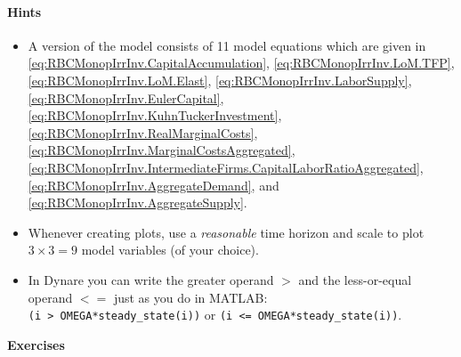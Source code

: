 \documentclass{article}
\begin{document}
\paragraph{Hints}
\begin{itemize}
\item A version of the model consists of 11 model equations which are given in
\eqref{eq:RBCMonopIrrInv.CapitalAccumulation},
\eqref{eq:RBCMonopIrrInv.LoM.TFP},
\eqref{eq:RBCMonopIrrInv.LoM.Elast},
\eqref{eq:RBCMonopIrrInv.LaborSupply},
\eqref{eq:RBCMonopIrrInv.EulerCapital},
\eqref{eq:RBCMonopIrrInv.KuhnTuckerInvestment},
\eqref{eq:RBCMonopIrrInv.RealMarginalCosts},
\eqref{eq:RBCMonopIrrInv.MarginalCostsAggregated},
\eqref{eq:RBCMonopIrrInv.IntermediateFirms.CapitalLaborRatioAggregated},
\eqref{eq:RBCMonopIrrInv.AggregateDemand}, and
\eqref{eq:RBCMonopIrrInv.AggregateSupply}.

\item Whenever creating plots, use a \emph{reasonable} time horizon
and scale to plot $3 \times 3=9$ model variables (of your choice).

\item In Dynare you can write the greater operand $>$ and the less-or-equal operand $<=$ just as you do in MATLAB:\\
\texttt{(i > OMEGA*steady\_state(i))} or \texttt{(i <= OMEGA*steady\_state(i))}.

\end{itemize}

\bigskip
\begin{center} \Large \textbf{Exercises} \end{center}
\end{document}
